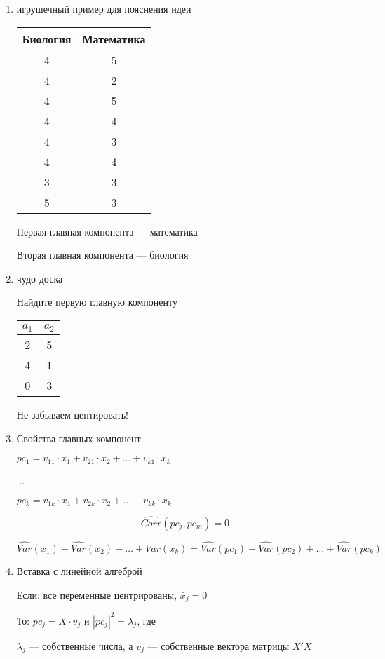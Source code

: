 \documentclass[12pt,a4paper]{article}
\begin{document}
{\begin{enumerate}
\item игрушечный пример для пояснения идеи

\begin{tabular}{cc}
Биология & Математика \\ 
\hline 
4 & 5 \\ 
4 & 2 \\ 
4 & 5 \\ 
4 & 4 \\ 
4 & 3 \\ 
4 & 4 \\ 
3 & 3 \\ 
5 & 3 \\ 
\end{tabular} 

Первая главная компонента --- математика

Вторая главная компонента --- биология

\item чудо-доска

Найдите первую главную компоненту

\begin{tabular}{cc}
$a_1$ & $a_2$ \\ 
\hline 
2 & 5 \\ 
4 & 1 \\ 
0 & 3 \\ 
\end{tabular} 

Не забываем центировать! 

\item Свойства главных компонент

$pc_1=v_{11} \cdot x_1 +  v_{21} \cdot x_2 + \ldots + v_{k1} \cdot x_k$

...

$pc_k=v_{1k} \cdot x_1 +  v_{2k} \cdot x_2 + \ldots + v_{kk} \cdot x_k$


\[
\widehat{Corr}(pc_j,pc_m)=0
\]
 
\[
\widehat{Var}(x_1)+ \widehat{Var}(x_2) + \ldots + \widehat{Var}(x_k) =
\widehat{Var}(pc_1)+ \widehat{Var}(pc_2) + \ldots + \widehat{Var}(pc_k)
\]



\item Вставка с линейной алгеброй

Если: все переменные центрированы, $\bar{x}_j=0$

То: $pc_j=X \cdot v_j$ и $|pc_j|^2=\lambda_j$, где

$\lambda_j$ --- собственные числа, а $v_{j}$ --- собственные вектора матрицы $X'X$


\end{enumerate}}
\end{document}
